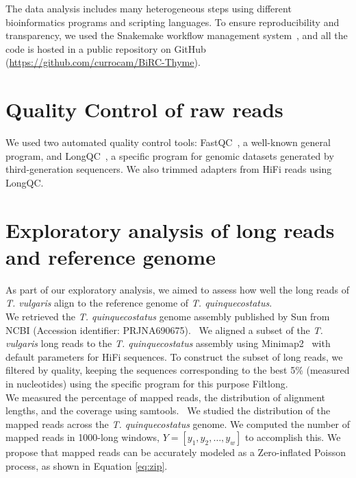 The data analysis includes many heterogeneous steps using different bioinformatics programs and scripting languages. To ensure reproducibility and transparency, we used the Snakemake workflow management system~\cite{molderSustainableDataAnalysis2021}, and all the code is hosted in a public repository on GitHub (\url{https://github.com/currocam/BiRC-Thyme}).

\section*{Quality Control of raw reads}


We used two automated quality control tools: FastQC~\cite{BabrahamBioinformaticsFastQC}, a well-known general program, and LongQC~\cite{fukasawaLongQCQualityControl2020}, a specific program for genomic datasets generated by third-generation sequencers. We also trimmed adapters from \ac{HiFi} reads using LongQC. ~\cite{fukasawaLongQCQualityControl2020}

\section*{Exploratory analysis of long reads and reference genome}

As part of our exploratory analysis, we aimed to assess how well the long reads of \textit{T. vulgaris} align to the reference genome of \textit{T. quinquecostatus}. \\

We retrieved the \textit{T. quinquecostatus} genome assembly published by Sun \etal from NCBI (Accession identifier: PRJNA690675).~\cite{sunChromosomelevelAssemblyAnalysis2022} We aligned a subset of the \textit{T. vulgaris} long reads to the \textit{T. quinquecostatus} assembly using Minimap2~\cite{liMinimap2PairwiseAlignment2018} with default parameters for \ac{HiFi} sequences. To construct the subset of long reads, we filtered by quality, keeping the sequences corresponding to the best 5\% (measured in nucleotides) using the specific program for this purpose Filtlong.~\cite{wickRrwickFiltlong2023}\\

We measured the percentage of mapped reads, the distribution of alignment lengths, and the coverage using samtools.~\cite{danecekTwelveYearsSAMtools2021} We studied the distribution of the mapped reads across the \textit{T. quinquecostatus} genome. We computed the number of mapped reads in 1000-long windows, $Y = [ y_1, y_2, \dots, y_w]$ to accomplish this. We propose that mapped reads can be accurately modeled as a Zero-inflated Poisson process, as shown in Equation \eqref{eq:zip}. \\

